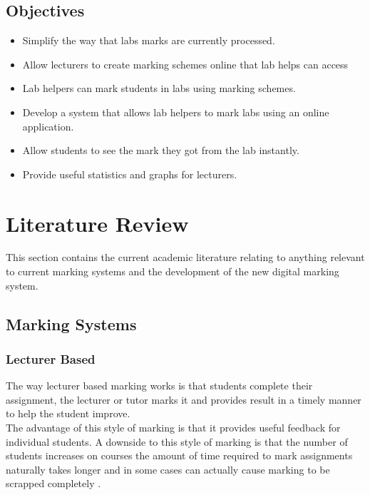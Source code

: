 \documentclass[12pt]{article}  %
\begin{document}
\subsection{Objectives}
\begin{itemize}
\item Simplify the way that labs marks are currently processed.
\item Allow lecturers to create marking schemes online that lab helps can access
\item Lab helpers can mark students in labs using marking schemes.
\item Develop a system that allows lab helpers to mark labs using an online application.
\item Allow students to see the mark they got from the lab instantly.
\item Provide useful statistics and graphs for lecturers.
\end{itemize}








\newpage
\section{Literature Review}
This section contains the current academic literature relating to anything relevant to current marking systems and the development of the new digital marking system.


\subsection{Marking Systems}

\subsubsection{Lecturer Based}
The way lecturer based marking works is that students complete their assignment, the lecturer or tutor marks it and provides result in a timely manner to help the student improve.\\
The advantage of this style of marking is that it provides useful feedback for individual students.
A downside to this style of marking is that the number of students increases on courses the amount of time required to mark assignments naturally takes longer and in some cases can actually cause marking to be scrapped completely \cite{brown_assessment_1999}. 
\end{document}
